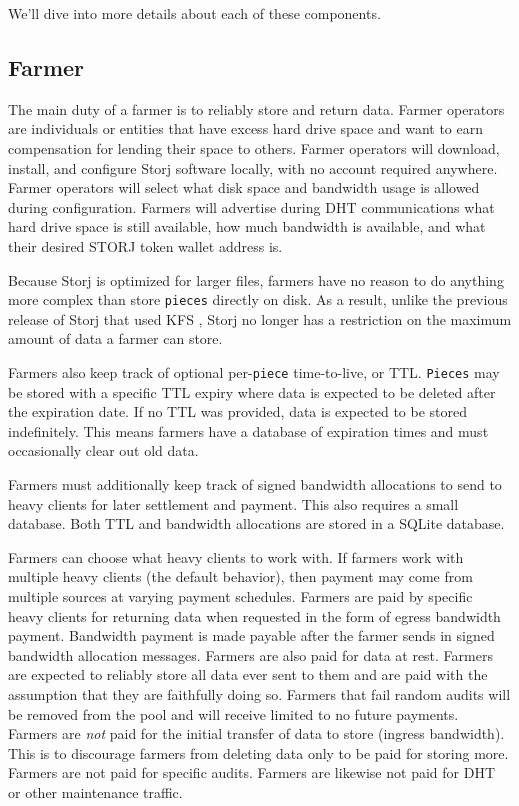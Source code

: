 \documentclass[a4paper,10pt]{article} \usepackage[utf8]{inputenc}
\newcommand{\x}[1]{{\tt #1}} \newcommand{\code}[1]{{\tt #1}}
\begin{document}
We'll dive into more details about each of these components.

\subsection{Farmer}

The main duty of a farmer is to reliably store and return data. Farmer operators
are individuals or entities that have excess hard drive space and want to earn
compensation for lending their space to others. Farmer operators will download,
install, and configure Storj software locally, with no account required
anywhere. Farmer operators will select what disk space and bandwidth usage
is allowed during configuration.
Farmers will advertise during DHT communications what hard drive space is still
available, how much bandwidth is available, and what their desired STORJ token
wallet address is.

Because Storj is optimized for larger files, farmers have no reason to do
anything more complex than store \x{pieces} directly on disk. As a result,
unlike the previous release of Storj that used KFS \cite{storj-v2}, Storj no
longer has a restriction on the maximum amount of data a farmer can store.

Farmers also keep track of optional per-\x{piece} time-to-live, or TTL.
\x{Pieces} may be stored with a specific TTL expiry where data is expected to
be deleted after the expiration date. If no TTL was provided, data is expected
to be stored indefinitely. This means farmers have a database of expiration
times and must occasionally clear out old data.

Farmers must additionally keep track of signed bandwidth allocations to send to
heavy clients for later settlement and payment. This also requires a small
database. Both TTL and bandwidth allocations are stored in a SQLite
\cite{sqlite} database.

Farmers can choose what heavy clients to work with. If farmers work with
multiple heavy clients (the default behavior), then payment may come from
multiple sources at varying payment schedules.
Farmers are paid by specific heavy clients for returning data when requested in
the form of egress bandwidth payment. Bandwidth payment is made payable after
the farmer sends in signed bandwidth allocation messages.
Farmers are also paid for data at rest.
Farmers are expected to reliably store all data ever sent to them and are paid
with the assumption that they are faithfully doing so.
Farmers that fail random audits will be removed from the pool and will receive
limited to no future payments.
Farmers are {\em not} paid for the initial transfer of data to store (ingress
bandwidth). This is to discourage farmers from deleting data only to be paid for
storing more. Farmers are not paid for specific audits. Farmers are likewise
not paid for DHT or other maintenance traffic.
\end{document}
